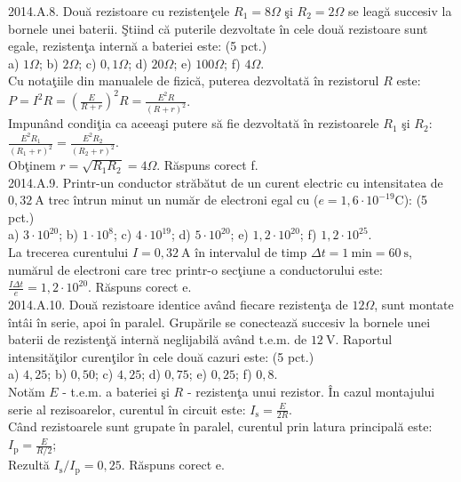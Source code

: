 2014.A.8. Două rezistoare cu rezistenţele $R_{1}=8 \Omega$ şi $R_{2}=2 \Omega$ se leagă succesiv la bornele unei baterii. Ştiind că puterile dezvoltate în cele două rezistoare sunt egale, rezistenţa internă a bateriei este: (5 pct.)\\ a) $1 \Omega$; b) $2 \Omega$; c) $0,1 \Omega$; d) $20 \Omega$; e) $100 \Omega$; f) $4 \Omega$.\\ Cu notaţiile din manualele de fizică, puterea dezvoltată în rezistorul $R$ este:\\ $P=I^{2} R=\left(\frac{E}{R+r}\right)^{2} R=\frac{E^{2} R}{(R+r)^{2}}$.\\ Impunând condiţia ca aceeaşi putere să fie dezvoltată în rezistoarele $R_{1}$ şi $R_{2}$:\\ $\frac{E^{2} R_{1}}{\left(R_{1}+r\right)^{2}}=\frac{E^{2} R_{2}}{\left(R_{2}+r\right)^{2}}$.\\ Obţinem $r=\sqrt{R_{1} R_{2}}=4 \Omega$. Răspuns corect f.\\

2014.A.9. Printr-un conductor străbătut de un curent electric cu intensitatea de $0,32 \mathrm{~A}$ trec întrun minut un număr de electroni egal cu ($e=1,6 \cdot 10^{-19} \mathrm{C}$): (5 pct.)\\ a) $3 \cdot 10^{20}$; b) $1 \cdot 10^{8}$; c) $4 \cdot 10^{19}$; d) $5 \cdot 10^{20}$; e) $1,2 \cdot 10^{20}$; f) $1,2 \cdot 10^{25}$.\\ La trecerea curentului $I=0,32 \mathrm{~A}$ în intervalul de timp $\Delta t=1 \mathrm{~min}=60 \mathrm{~s}$, numărul de electroni care trec printr-o secţiune a conductorului este:\\ $\frac{I \Delta t}{e}=1,2 \cdot 10^{20}$. Răspuns corect e.\\

2014.A.10. Două rezistoare identice având fiecare rezistenţa de $12 \Omega$, sunt montate întâi în serie, apoi în paralel. Grupările se conectează succesiv la bornele unei baterii de rezistenţă internă neglijabilă având t.e.m. de $12 \mathrm{~V}$. Raportul intensităţilor curenţilor în cele două cazuri este: (5 pct.)\\ a) $4,25$; b) $0,50$; c) $4,25$; d) $0,75$; e) $0,25$; f) $0,8$.\\ Notăm $E$ - t.e.m. a bateriei şi $R$ - rezistenţa unui rezistor. În cazul montajului serie al rezisoarelor, curentul în circuit este: $I_{\mathrm{s}}=\frac{E}{2 R}$.\\ Când rezistoarele sunt grupate în paralel, curentul prin latura principală este:\\ $I_{\mathrm{p}}=\frac{E}{R / 2}$;\\ Rezultă $I_{\mathrm{s}} / I_{\mathrm{p}}=0,25$. Răspuns corect e.\\

